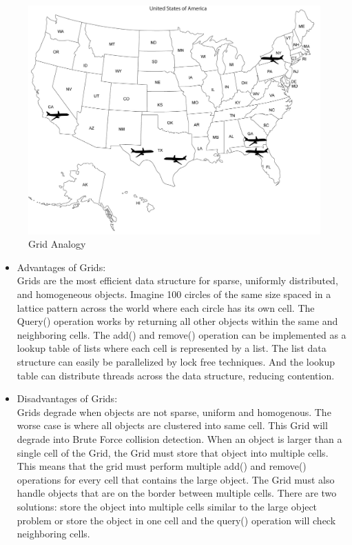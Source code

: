 \documentclass[conference]{IEEEtran}
\begin{document}
\begin{figure}[!h]
\centering
\includegraphics[scale=0.15]{usa}
\caption{Grid Analogy}
\label{fig_sim}
\end{figure}

\begin{itemize}
  \item Advantages of Grids:\\
  Grids are the most efficient data structure for sparse, uniformly distributed, and homogeneous objects. Imagine 100 circles of the same size spaced in a lattice pattern across the world where each circle has it\textquotesingle s own cell. The Query() operation works by returning all other objects within the same and neighboring cells. The add() and remove() operation can be implemented as a lookup table of lists where each cell is represented by a list. The list data structure can easily be parallelized by lock free techniques. And the lookup table can distribute threads across the data structure, reducing contention.\\
  \item Disadvantages of Grids:\\
  Grids degrade when objects are not sparse, uniform and homogenous. The worse case is where all objects are clustered into same cell. This Grid will degrade into Brute Force collision detection. When an object is larger than a single cell of the Grid, the Grid must store that object into multiple cells. This means that the grid must perform multiple add() and remove() operations for every cell that contains the large object. The Grid must also handle objects that are on the border between multiple cells. There are two solutions: store the object into multiple cells similar to the large object problem or store the object in one cell and the query() operation will check neighboring cells.
\end{itemize}
\end{document}
